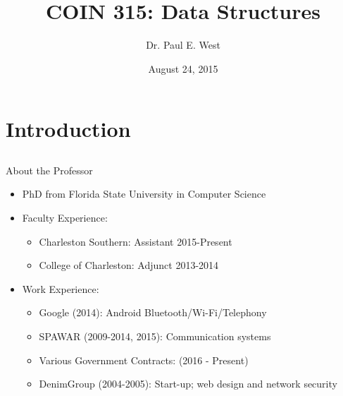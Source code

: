 \documentclass{beamer}
\title{COIN 315: Data Structures}
\author{Dr. Paul E. West}
\institute{
  Department of Computer Science\\
  Charleston Southern University
}
\date{August 24, 2015}
\begin{document}
\begin{frame}
  \titlepage
\end{frame}

\section{Introduction}
\subsection{}
\begin{frame}{About the Professor}
\begin{itemize}
\item PhD from Florida State University in Computer Science
\item Faculty Experience:
\begin{itemize}
\item Charleston Southern: Assistant 2015-Present
\item College of Charleston: Adjunct 2013-2014
\end{itemize}
\item Work Experience:
\begin{itemize}
\item Google (2014): Android Bluetooth/Wi-Fi/Telephony
\item SPAWAR (2009-2014, 2015): Communication systems
\item Various Government Contracts: (2016 - Present)
\item DenimGroup (2004-2005): Start-up; web design and network security
\end{itemize}
\end{itemize}
\end{frame}
\end{document}
